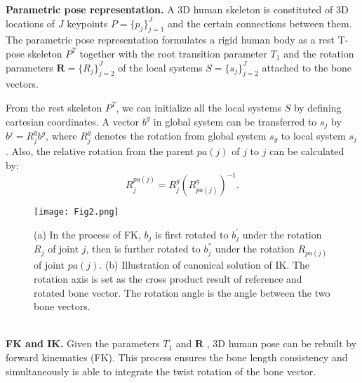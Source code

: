 \documentclass[lettersize,journal]{IEEEtran}
\begin{document}
\noindent \textbf{Parametric pose representation.}
\quad A 3D human skeleton is constituted of 3D locations of $J$ keypoints $P = \lbrace p_{j} \rbrace_{j=1}^{J}$ and the certain connections between them. The parametric pose representation formulates a rigid human body as a rest T-pose skeleton $P^{T}$ together with the root transition parameter $T_{1}$ and the rotation parameters $\boldsymbol{R} = \lbrace R_{j} \rbrace_{j=2}^{J}$ of the local systems $S = \lbrace s_{j} \rbrace_{j=2}^{J}$ attached to the bone vectors. 

From the rest skeleton $P^{T}$, we can initialize all the local systems $S$ by defining cartesian coordinates. A vector $b^{g}$ in global system can be transferred to $s_j$ by $b^{j} = R_{j}^{g} b^{g}$, where $R_{j}^{g}$ denotes the rotation from global system $s_{g}$ to local system $s_{j}$. Also, the relative rotation from the parent $pa(j)$ of $j$ to $j$ can be calculated by:
\begin{equation}
R_{j}^{pa(j)} = R_{j}^{g} (R_{pa(j)}^g)^{-1} \label{equa1}.
\end{equation}

\begin{figure}[t]
 \begin{center}
 	\centerline{\texttt{[image: Fig2.png]}}
\caption{(a) In the process of FK, $b_{j}$ is first rotated to $b_{j}^{'}$ under the rotation $R_{j}$ of joint $j$, then is further rotated to $b_{j}^{''}$ under the rotation $R_{pa(j)}$ of joint $pa(j)$. (b) Illustration of canonical solution of IK. The rotation axis is set as the cross product result of reference and rotated bone vector. The rotation angle is the angle between the two bone vectors.}
\label{fig2}
\end{center}
\end{figure}

~\\
\noindent \textbf{FK and IK.}
\quad Given the parameters $T_{1}$ and $\boldsymbol{R}$ , 3D human pose can be rebuilt by forward kinematics (FK). This process ensures the bone length consistency and simultaneously is able to integrate the twist rotation of the bone vector.
\end{document}
